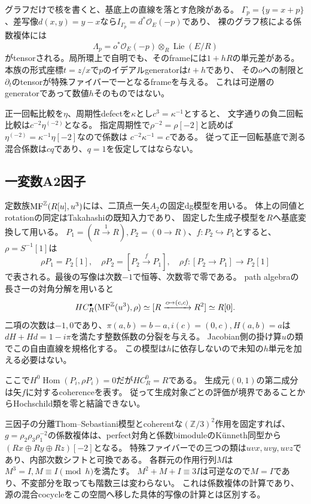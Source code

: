 グラフだけで核を書くと、基底上の直線を落とす危険がある。
$\Gamma_p=\{y=x+p\}$、差写像$d(x,y)=y-x$なら$I_{\Gamma_p}=d^*\mathcal O_E(-p)$であり、
裸のグラフ核による係数複体には
\[
 \Lambda_p=o^*\mathcal O_E(-p)\otimes_R\operatorname{Lie}(E/R)
\]
がtensorされる。局所環上で自明でも、そのframeには$1+hR$の単元差がある。
本族の形式座標$t=z/x$で$p$のイデアルgeneratorは$t+h$であり、
その$o$への制限と$\partial_t$のtensorが特殊ファイバーで一となるframeを与える。
これは可逆層のgeneratorであって数値$h$そのものではない。

正一回転比較を$\eta$、周期性defectを$\kappa$とし$c^3=\kappa^{-1}$とすると、
文字通りの負二回転比較は$c^{-2}\eta^{(-2)}$となる。
指定周期性で$\rho^{-2}=\rho[-2]$と読めば
$\eta^{(-2)}=\kappa^{-1}\eta[-2]$なので係数は
$c^{-2}\kappa^{-1}=c$である。
従って正一回転基底で測る混合係数は$cq$であり、$q=1$を仮定してはならない。

\subsection{一変数A2因子}
定数族$\operatorname{MF}^{\mathbb Z}(R[u],u^3)$には、二頂点一矢$A_2$の固定dg模型を用いる。
体上の同値とrotationの同定はTakahashi\cite{Takahashi}の既知入力であり、
固定した生成子模型を$R$へ基底変換して用いる。
$P_1=(R\xrightarrow1R),P_2=(0\to R)$、$f:P_2\hookrightarrow P_1$とすると、
$\rho=S^{-1}[1]$は
\[
 \rho P_1=P_2[1],\quad\rho P_2=[P_2\xrightarrow fP_1],\quad
 \rho f:[P_2\to P_1]\to P_2[1]
\]
で表される。最後の写像は次数$-1$で恒等、次数零で零である。
path algebraの長さ一の対角分解を用いると
\[
 HC_R^\bullet(\operatorname{MF}^{\mathbb Z}(u^3),\rho)
 \simeq[R\xrightarrow{c\mapsto(c,c)}R^2]\simeq R[0].
\]
二項の次数は$-1,0$であり、$\pi(a,b)=b-a,i(c)=(0,c),H(a,b)=a$は
$dH+Hd=1-i\pi$を満たす整数係数の分裂を与える。
Jacobian側の掛け算$u$の類でこの自由直線を規格化する\cite{BFK}。
この模型は$h$に依存しないので未知の$h$単元を加える必要はない。

ここで$H^0\operatorname{Hom}(P_i,\rho P_i)=0$だが$HC_R^0=R$である。
生成元$(0,1)$の第二成分は矢$f$に対するcoherenceを表す。
従って生成対象ごとの評価が境界であることからHochschild類を零と結論できない。

三因子の分離Thom--Sebastiani模型とcoherentな$(\mathbb Z/3)^2$作用を固定すれば、
$g=\rho_2\rho_3\rho_1^{-2}$の係数複体は、perfect対角と係数bimoduleのKünneth同型から
$(Rx\oplus Ry\oplus Rz)[-2]$となる。
特殊ファイバーでの三つの類は$uvx,uvy,uvz$であり、内部次数シフトと可換である。
各群元の作用行列$M$は$M^3=I,M\equiv I\pmod h$を満たす。
$M^2+M+I\equiv3I$は可逆なので$M=I$であり、不変部分を取っても階数三は変わらない。
これは係数複体の計算であり、源の混合cocycleをこの空間へ移した具体的写像の計算とは区別する。
